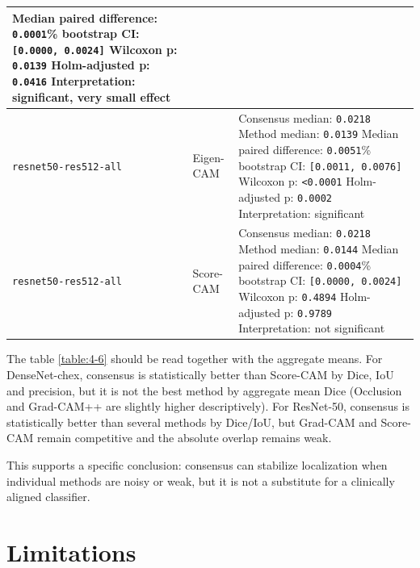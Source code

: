 \begin{longtable}[]{@{}
		>{\raggedright\arraybackslash}p{}
		>{\raggedright\arraybackslash}p{}
		>{\raggedright\arraybackslash}p{}
		@{}}
	Median paired difference: \texttt{0.0001}\newline
	95\% bootstrap CI: \texttt{[0.0000, 0.0024]}\newline
	Wilcoxon p: \texttt{0.0139}\newline
	Holm-adjusted p: \texttt{0.0416}\newline
	Interpretation: significant, very small effect\tabularnewline
	\midrule
	\texttt{resnet50-\allowbreak res512-\allowbreak all} & Eigen-CAM &
	Consensus median: \texttt{0.0218}\newline
	Method median: \texttt{0.0139}\newline
	Median paired difference: \texttt{0.0051}\newline
	95\% bootstrap CI: \texttt{[0.0011, 0.0076]}\newline
	Wilcoxon p: \texttt{\textless0.0001}\newline
	Holm-adjusted p: \texttt{0.0002}\newline
	Interpretation: significant\tabularnewline
	\midrule
	\texttt{resnet50-\allowbreak res512-\allowbreak all} & Score-CAM &
	Consensus median: \texttt{0.0218}\newline
	Method median: \texttt{0.0144}\newline
	Median paired difference: \texttt{0.0004}\newline
	95\% bootstrap CI: \texttt{[0.0000, 0.0024]}\newline
	Wilcoxon p: \texttt{0.4894}\newline
	Holm-adjusted p: \texttt{0.9789}\newline
	Interpretation: not significant\tabularnewline
	\bottomrule
\end{longtable}
\endgroup

The table \ref{table:4-6} should be read together with the aggregate means. For
DenseNet-chex, consensus is statistically better than
Score-CAM by Dice, IoU and precision, but it is not the best method
by aggregate mean Dice (Occlusion and
Grad-CAM++ are slightly higher descriptively). For
ResNet-50, consensus is statistically better than several methods by
Dice/IoU, but Grad-CAM and Score-CAM remain
competitive and the absolute overlap remains weak. 

This supports a
specific conclusion: consensus can stabilize localization when individual
methods are noisy or weak, but it is not a substitute for a clinically
aligned classifier.

\hypertarget{limitations}{%
	\section{Limitations}\label{limitations}}

